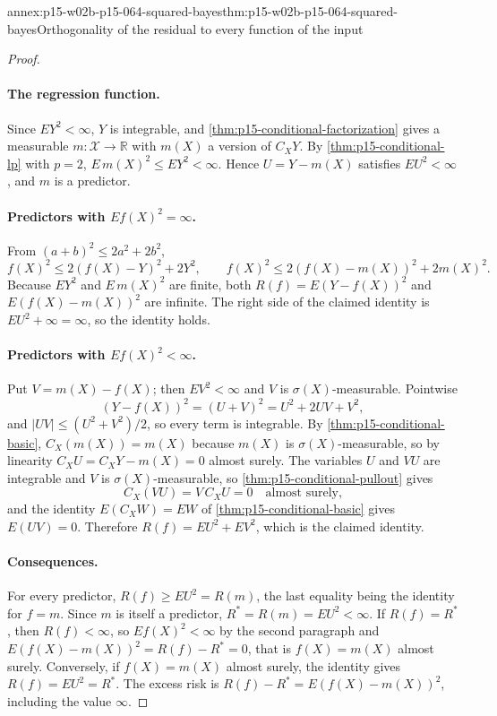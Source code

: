 \begin{annexitem}{annex:p15-w02b-p15-064-squared-bayes}{thm:p15-w02b-p15-064-squared-bayes}{Orthogonality of the residual to every function of the input}
\begin{proof}
\paragraph{The regression function.}
Since \(EY^2<\infty\), \(Y\) is integrable, and
\cref{thm:p15-conditional-factorization} gives a measurable
\(m:\mathcal X\to\mathbb R\) with \(m(X)\) a version of \(C_XY\). By
\cref{thm:p15-conditional-lp} with \(p=2\),
\(E\,m(X)^2\leq EY^2<\infty\). Hence \(U=Y-m(X)\) satisfies
\(EU^2<\infty\), and \(m\) is a predictor.

\paragraph{Predictors with \(E f(X)^2=\infty\).}
From \((a+b)^2\leq2a^2+2b^2\),
\[
 f(X)^2\leq2(f(X)-Y)^2+2Y^2,\qquad
 f(X)^2\leq2(f(X)-m(X))^2+2m(X)^2 .
\]
Because \(EY^2\) and \(E\,m(X)^2\) are finite, both \(R(f)=E(Y-f(X))^2\) and
\(E(f(X)-m(X))^2\) are infinite. The right side of the claimed identity is
\(EU^2+\infty=\infty\), so the identity holds.

\paragraph{Predictors with \(E f(X)^2<\infty\).}
Put \(V=m(X)-f(X)\); then \(EV^2<\infty\) and \(V\) is
\(\sigma(X)\)-measurable. Pointwise
\[
 (Y-f(X))^2=(U+V)^2=U^2+2UV+V^2,
\]
and \(|UV|\leq(U^2+V^2)/2\), so every term is integrable. By
\cref{thm:p15-conditional-basic}, \(C_X(m(X))=m(X)\) because \(m(X)\) is
\(\sigma(X)\)-measurable, so by linearity \(C_XU=C_XY-m(X)=0\) almost surely.
The variables \(U\) and \(VU\) are integrable and \(V\) is
\(\sigma(X)\)-measurable, so \cref{thm:p15-conditional-pullout} gives
\[
 C_X(VU)=V\,C_XU=0\quad\text{almost surely,}
\]
and the identity \(E(C_XW)=EW\) of \cref{thm:p15-conditional-basic} gives
\(E(UV)=0\). Therefore \(R(f)=EU^2+EV^2\), which is the claimed
identity.

\paragraph{Consequences.}
For every predictor, \(R(f)\geq EU^2=R(m)\), the last equality being the
identity for \(f=m\). Since \(m\) is itself a predictor,
\(R^{*}=R(m)=EU^2<\infty\). If \(R(f)=R^{*}\), then \(R(f)<\infty\), so
\(E f(X)^2<\infty\) by the second paragraph and
\(E(f(X)-m(X))^2=R(f)-R^{*}=0\), that is \(f(X)=m(X)\) almost surely.
Conversely, if \(f(X)=m(X)\) almost surely, the identity gives
\(R(f)=EU^2=R^{*}\). The excess risk is \(R(f)-R^{*}=E(f(X)-m(X))^2\),
including the value \(\infty\).
\end{proof}
\end{annexitem}

